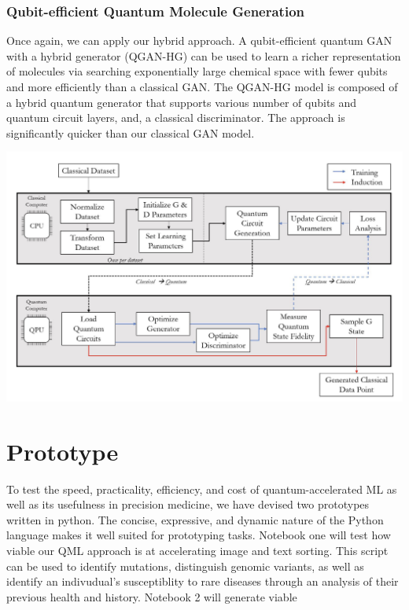 \documentclass{scrartcl}
\begin{document}
\subsubsection{Qubit-efficient Quantum Molecule Generation}
\label{sec:org09474db}

Once again, we can apply our hybrid approach. A qubit-efficient quantum GAN with a hybrid generator (QGAN-HG) can be used to learn a richer representation of molecules via searching exponentially large chemical space with fewer qubits and more efficiently than a classical GAN. The QGAN-HG model is composed of a hybrid quantum generator that supports various number of qubits and quantum circuit layers, and, a classical discriminator. The approach is significantly quicker than our classical GAN model.

\begin{center}
\includegraphics[width=.9\linewidth]{./assets/systemarchitecture.png}
\end{center}

\section{Prototype}
\label{sec:org4b87827}

To test the speed, practicality, efficiency, and cost of quantum-accelerated ML as well as its usefulness in precision medicine, we have devised two prototypes written in python. The concise, expressive, and dynamic nature of the Python language makes it well suited for prototyping tasks. Notebook one will test how viable our QML approach is at accelerating image and text sorting. This script can be used to identify mutations, distinguish genomic variants, as well as identify an indivudual's susceptiblity to rare diseases through an analysis of their previous health and history. Notebook 2 will generate viable
\end{document}
